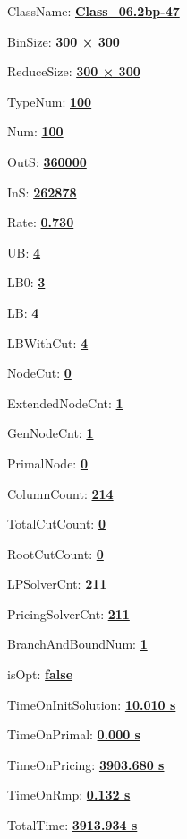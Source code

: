 \documentclass[11pt]{article}
\begin{document}
\pagestyle{empty}


ClassName: \underline{\textbf{Class_06.2bp-47}}
\par
BinSize: \underline{\textbf{300 × 300}}
\par
ReduceSize: \underline{\textbf{300 × 300}}
\par
TypeNum: \underline{\textbf{100}}
\par
Num: \underline{\textbf{100}}
\par
OutS: \underline{\textbf{360000}}
\par
InS: \underline{\textbf{262878}}
\par
Rate: \underline{\textbf{0.730}}
\par
UB: \underline{\textbf{4}}
\par
LB0: \underline{\textbf{3}}
\par
LB: \underline{\textbf{4}}
\par
LBWithCut: \underline{\textbf{4}}
\par
NodeCut: \underline{\textbf{0}}
\par
ExtendedNodeCnt: \underline{\textbf{1}}
\par
GenNodeCnt: \underline{\textbf{1}}
\par
PrimalNode: \underline{\textbf{0}}
\par
ColumnCount: \underline{\textbf{214}}
\par
TotalCutCount: \underline{\textbf{0}}
\par
RootCutCount: \underline{\textbf{0}}
\par
LPSolverCnt: \underline{\textbf{211}}
\par
PricingSolverCnt: \underline{\textbf{211}}
\par
BranchAndBoundNum: \underline{\textbf{1}}
\par
isOpt: \underline{\textbf{false}}
\par
TimeOnInitSolution: \underline{\textbf{10.010 s}}
\par
TimeOnPrimal: \underline{\textbf{0.000 s}}
\par
TimeOnPricing: \underline{\textbf{3903.680 s}}
\par
TimeOnRmp: \underline{\textbf{0.132 s}}
\par
TotalTime: \underline{\textbf{3913.934 s}}
\par
\newpage
\end{document}
